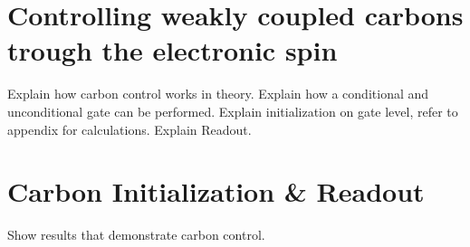 \section{Controlling weakly coupled carbons trough the electronic spin}

Explain how carbon control works in theory.
Explain how a conditional and unconditional gate can be performed.
Explain initialization on gate level, refer to appendix for calculations.
Explain Readout.



\section{Carbon Initialization \& Readout}
Show results that demonstrate carbon control.



